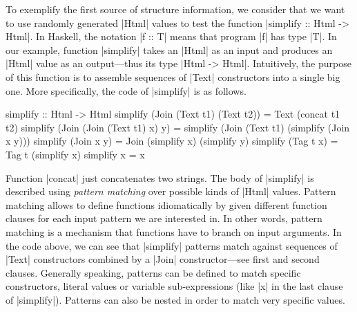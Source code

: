 To exemplify the first source of structure information, we consider that we want
to use randomly generated |Html| values to test the function |simplify :: Html
-> Html|.
%
In Haskell, the notation |f :: T| means that program |f| has type |T|.
%
In our example, function |simplify| takes an |Html| as an input and produces an
|Html| value as an output---thus its type |Html -> Html|.
%
Intuitively, the purpose of this function is to assemble sequences of |Text|
constructors into a single big one.
%
More specifically, the code of |simplify| is as follows.
%
\begin{code}
simplify :: Html -> Html
simplify (Join (Text t1) (Text t2))
  = Text (concat t1 t2)
simplify (Join (Join (Text t1) x) y)
  = simplify (Join (Text t1) (simplify (Join x y)))
simplify (Join x y) = Join (simplify x) (simplify y)
simplify (Tag t x) = Tag t (simplify x)
simplify x = x
\end{code}
%
Function |concat| just concatenates two strings.
%
The body of |simplify| is described using \emph{pattern matching} over possible
kinds of |Html| values.
%
Pattern matching allows to define functions idiomatically by given different
function clauses for each input pattern we are interested in.
%
In other words, pattern matching is a mechanism that functions have to branch on
input arguments.
%
In the code above, we can see that |simplify| patterns match against sequences
of |Text| constructors combined by a |Join| constructor---see first and second
clauses.
%
Generally speaking, patterns can be defined to match specific constructors,
literal values or variable sub-expressions (like |x| in the last clause of
|simplify|).
%
Patterns can also be nested in order to match very specific values.



